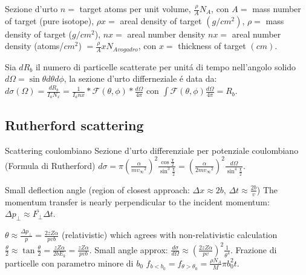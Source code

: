 \begin{wordonframe}{Sezione d'urto}
$n=$ target atoms per unit volume, $\frac{\rho}{A}N_A$, con $A=$ mass number of target (pure isotope), $\rho x=$ areal density of target $(g/{cm}^2)$, $\rho=$ mass density of target (${g/{cm}^2}$), $nx=$ areal number density $nx=$ areal number density (atoms/$cm^2$) $=\frac{\rho}{A}xN_{Avogadro}$, con $x=$ thickness of target $(cm)$.

 Sia $dR_b$ il numero di particelle scatterate per unit\'a di tempo nell'angolo solido\\ $d\Omega=\sin{\theta} d\theta d\phi$, la sezione d'urto differneziale \'e data da:
 $d\sigma(\Omega)=\frac{dR_b}{I_aN_x}=\frac{1}{I_anx}*\mathcal{F}(\theta,\phi)*\frac{d\Omega}{4\pi}$ con $\int\mathcal{F}(\theta,\phi)\frac{d\Omega}{4\pi}=R_b$.
 

\end{wordonframe}

\subsection{Rutherford scattering}

\begin{frame}{Scattering coulombiano}
Sezione d'urto differenziale per potenziale coulombiano (Formula di Rutherford)
$d\sigma=\pi(\frac{\alpha}{m{v_{\infty}}^2})^2\frac{\cos{\frac{\chi}{2}}}{\sin^3{\frac{\chi}{2}}}=(\frac{\alpha}{2m{v_{\infty}}^2})^2\frac{d\Omega}{\sin^4{\frac{\chi}{2}}}$.

Small deflection angle (region of closest approach: $\Delta x\approx 2b$, $\Delta t\approx\frac{2b}{v}$) The momentum transfer is nearly perpendicular to the incident momentum: $\Delta p_{\perp}\approx \overline{F_{\perp}}\Delta t$.

$\theta\approx\frac{\Delta p_{\perp}}{p}=\frac{2zZ\alpha}{pvb}$ (relativistic) which agrees with non-relativistic calculation $\frac{\theta}{2}\approx\tan{\frac{\theta}{2}}=\frac{zZ\alpha}{2bE_k}=\frac{zZ\alpha}{pvb}$.
Small angle approx: $\frac{d\sigma}{d\Omega}\approx(\frac{2zZ\alpha}{pv})^2\frac{1}{\theta^4}$. 
Frazione di particelle con parametro minore di $b_0$ $f_{b<b_0}=f_{\theta>\theta_0}=\frac{\rho N_A}{M}\pi b_0^2t$.
\end{frame}

